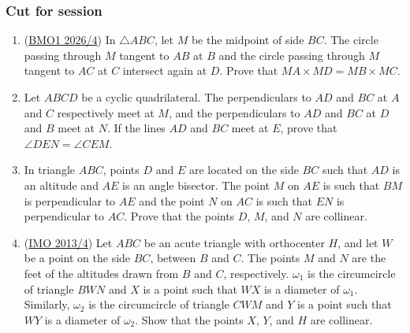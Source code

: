 \documentclass[11pt,paper=letter]{scrartcl}
\begin{document}
\subsubsection*{Cut for session}

\begin{enumerate}[resume]

\item (\href{https://bmos.ukmt.org.uk/home/bmo1-2026-report.pdf}{BMO1 2026/4}) In $\triangle ABC$, let $M$ be the midpoint of side $BC$. The circle passing through $M$ tangent to $AB$ at $B$ and the circle passing through $M$ tangent to $AC$ at $C$ intersect again at $D$. Prove that $MA \times MD = MB \times MC$. %


\item Let $ABCD$ be a cyclic quadrilateral. The perpendiculars to $AD$ and $BC$ at $A$ and $C$ respectively meet at $M$, and the perpendiculars to $AD$ and $BC$ at $D$ and $B$ meet at $N$. If the lines $AD$ and $BC$ meet at $E$, prove that $\angle DEN = \angle CEM$. %

\item In triangle $ABC$, points $D$ and $E$ are located on the side $BC$ such that $AD$ is an altitude and $AE$ is an angle bisector. The point $M$ on $AE$ is such that $BM$ is perpendicular to $AE$ and the point $N$ on $AC$ is such that $EN$ is perpendicular to $AC$. Prove that the points $D$, $M$, and $N$ are collinear. %

\item (\href{https://artofproblemsolving.com/community/c6h1181533p5720174}{IMO 2013/4}) Let $ABC$ be an acute triangle with orthocenter $H$, and let $W$ be a point on the side $BC$, between $B$ and $C$. The points $M$ and $N$ are the feet of the altitudes drawn from $B$ and $C$, respectively. $\omega_1$ is the circumcircle of triangle $BWN$ and $X$ is a point such that $WX$ is a diameter of $\omega_1$. Similarly, $\omega_2$ is the circumcircle of triangle $CWM$ and $Y$ is a point such that $WY$ is a diameter of $\omega_2$. Show that the points $X$, $Y$, and $H$ are collinear. %


\end{enumerate}
\end{document}
